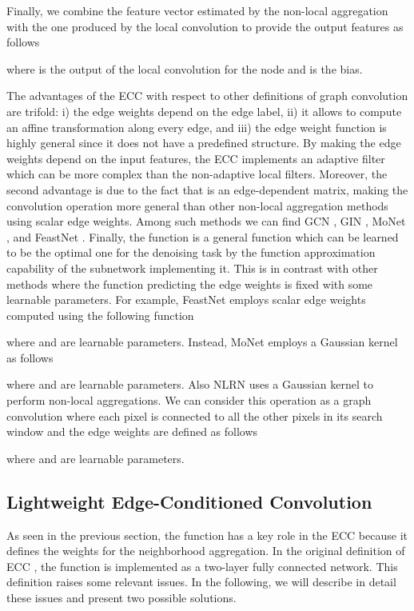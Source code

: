 \documentclass[journal]{IEEEtran}
\begin{document}
Finally, we combine the feature vector estimated by the non-local aggregation with the one produced by the local convolution to provide the output features as follows

where  is the output of the  local convolution for the node  and  is the bias.

The advantages of the ECC with respect to other definitions of graph convolution are trifold: i) the edge weights depend on the edge label, ii) it allows to compute an affine transformation along every edge, and iii) the edge weight function is highly general since it does not have a predefined structure. By making the edge weights depend on the input features, the ECC implements an adaptive filter which can be more complex than the non-adaptive local filters. Moreover, the second advantage is due to the fact that  is an edge-dependent matrix, making the convolution operation more general than other non-local aggregation methods using scalar edge weights. Among such methods we can find GCN \cite{kipf2016semi}, GIN \cite{xu2018powerful}, MoNet \cite{monti2017geometric}, and FeastNet \cite{verma2018feastnet}.  Finally, the  function is a general function which can be learned to be the optimal one for the denoising task by the function approximation capability of the subnetwork implementing it. This is in contrast with other methods where the function predicting the edge weights is fixed with some learnable parameters. For example, FeastNet \cite{verma2018feastnet} employs scalar edge weights computed using the following function

where  and  are learnable parameters. Instead, MoNet \cite{monti2017geometric} employs a Gaussian kernel as follows

where  and  are learnable parameters. Also NLRN \cite{liu2018non} uses a Gaussian kernel to perform non-local aggregations. We can consider this operation as a graph convolution where each pixel is connected to all the other pixels in its search window and the edge weights are defined as follows

where  and  are learnable parameters.


\subsection{Lightweight Edge-Conditioned Convolution} \label{sec:ecc}
As seen in the previous section, the function  has a key role in the ECC because it defines the weights for the neighborhood aggregation. In the original definition of ECC \cite{simonovsky2017dynamic}, the function  is implemented as a two-layer fully connected network. This definition raises some relevant issues. In the following, we will describe in detail these issues and present two possible solutions.
\end{document}
